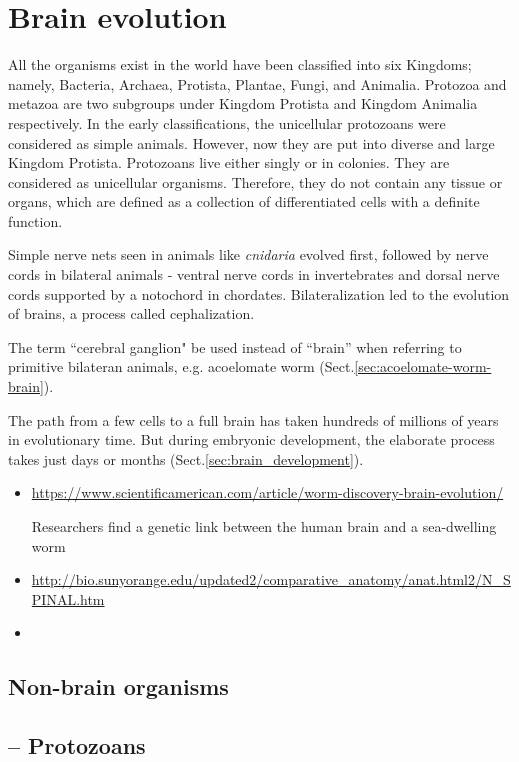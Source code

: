 \chapter{Brain evolution}
\label{chap:brain-evolution}

All the organisms exist in the world have been classified into six Kingdoms;
namely, Bacteria, Archaea, Protista, Plantae, Fungi, and Animalia. Protozoa and
metazoa are two subgroups under Kingdom Protista and Kingdom Animalia respectively.
In the early classifications, the unicellular protozoans were considered as
simple animals. However, now they are put into diverse and large Kingdom Protista.
Protozoans live either singly or in colonies. They are considered as unicellular
organisms. Therefore, they do not contain any tissue or organs, which are
defined as a collection of differentiated cells with a definite function. 

Simple nerve nets seen in animals like {\it cnidaria} evolved first, followed by
nerve cords in bilateral animals  -  ventral nerve cords in invertebrates and
dorsal nerve cords supported by a notochord in chordates. Bilateralization led
to the evolution of brains, a process called cephalization.

The term ``cerebral ganglion" be used instead of ``brain'' when referring to
primitive bilateran animals, e.g. acoelomate worm
(Sect.\ref{sec:acoelomate-worm-brain}).

The path from a few cells to a full brain has taken hundreds of millions of
years in evolutionary time. But during embryonic development, the elaborate
process takes just days or months (Sect.\ref{sec:brain_development}).  
\begin{itemize}
  \item
  \url{https://www.scientificamerican.com/article/worm-discovery-brain-evolution/}
  
Researchers find a genetic link between the human brain and a sea-dwelling worm


  \item \url{http://bio.sunyorange.edu/updated2/comparative_anatomy/anat.html2/N_SPINAL.htm}
  \item 
\end{itemize}


\section{Non-brain organisms}

\section{-- Protozoans}
\label{sec:protozoans}


